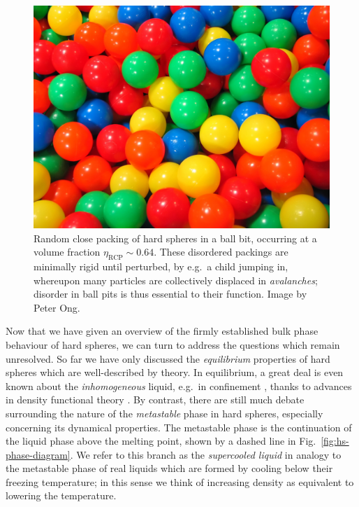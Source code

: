 \documentclass[11pt,twoside]{report}
\begin{document}
\begin{figure}
  \includegraphics[width=0.75\linewidth,outer]{ball-pit-horizontal}
  \caption[Random close packing in a ball pit]{
    Random close packing of hard spheres in a ball bit, occurring at a volume fraction $\eta_\mathrm{RCP} \sim 0.64$.
    These disordered packings are minimally rigid until perturbed, by e.g.\ a child jumping in, whereupon many particles are collectively displaced in \emph{avalanches}; disorder in ball pits is thus essential to their function.
    Image by Peter Ong.}
  \label{fig:rcp}
\end{figure}

Now that we have given an overview of the firmly established bulk phase behaviour of hard spheres, we can turn to address the questions which remain unresolved.
So far we have only discussed the \emph{equilibrium} properties of hard spheres which are well-described by theory.
In equilibrium, a great deal is even known about the \emph{inhomogeneous} liquid, e.g.\ in confinement \cite{GonzalezJCP1998}, thanks to advances in density functional theory \cite{RosenfeldPRL1989,RothJPCM2010}.
By contrast, there are still much debate surrounding the nature of the \emph{metastable} phase in hard spheres, especially concerning its dynamical properties.
The metastable phase is the continuation of the liquid phase above the melting point, shown by a dashed line in Fig.\ \ref{fig:hs-phase-diagram}.
We refer to this branch as the \emph{supercooled liquid} in analogy to the metastable phase of real liquids which are formed by cooling below their freezing temperature; in this sense we think of increasing density as equivalent to lowering the temperature.
\end{document}
